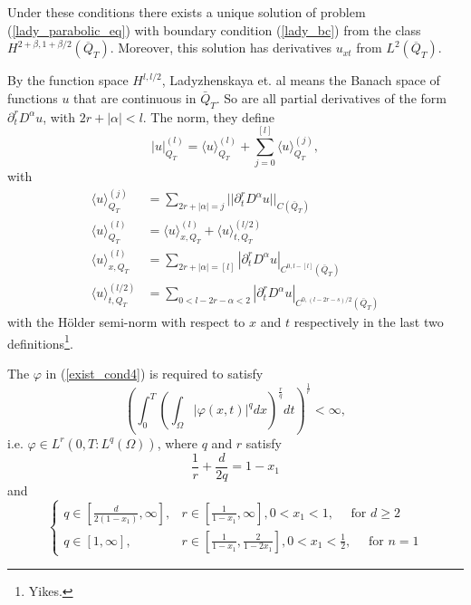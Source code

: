 \documentclass[11pt, a4paper]{article}
\begin{document}
\begin{appendices}
\begin{theorem}
Under these conditions there exists a unique solution of problem (\ref{lady_parabolic_eq}) with boundary condition (\ref{lady_bc}) from the class $H^{2+\beta, 1+\beta/2}(\overline{Q}_T)$. Moreover, this solution has derivatives $u_{xt}$ from $L^2(\overline{Q}_T)$.
\end{theorem}

\setcounter{rem}{0}
\begin{rem}
\label{rem:lady_notation}
By the function space $H^{l, l/2}$, Ladyzhenskaya et. al means the Banach space of functions $u$ that are continuous in $\bar{Q}_T$. So are all partial derivatives of the form $\partial_t^r D^\alpha u$, with $2r+|\alpha| <l$. The norm, they define
\begin{equation*}
	|u|_{Q_T}^{(l)} = \langle u \rangle^{(l)}_{Q_T} + \sum_{j=0}^{[l]}\langle u \rangle^{(j)}_{Q_T},
\end{equation*}
with
\begin{align*}
\langle u \rangle^{(j)}_{Q_T} &= \sum_{2r+|\alpha|=j} ||\partial_t^r D^\alpha u||_{C(\bar{Q}_T)} \\
\langle u \rangle^{(l)}_{Q_T} &= \langle u \rangle^{(l)}_{x,Q_T} + \langle u \rangle^{(l/2)}_{t,Q_T} \\
\langle u \rangle^{(l)}_{x,Q_T} &= \sum_{2r+|\alpha|=[l]} |\partial_t^r D^{\alpha}u|_{C^{0,l-[l]}(\bar{Q}_T)} \\
 \langle u \rangle^{(l/2)}_{t,Q_T} &= \sum_{0 < l - 2r -\alpha < 2} |\partial_t^r D^\alpha u|_{C^{0,(l-2r-s)/2}(\bar{Q}_T)}
\end{align*}
with the Hölder semi-norm with respect to $x$ and $t$ respectively in the last two definitions\footnote{Yikes.}.
\end{rem}

\begin{rem}
The  $\varphi$ in (\ref{exist_cond4}) is required to satisfy
\begin{equation*}
\left( \int_0^T \left(\int_\Omega |\varphi(x,t)|^q dx\right)^\frac{r}{q} dt \right)^\frac{1}{r} < \infty,
\end{equation*}
i.e. $\varphi \in L^r(0,T: L^q(\Omega))$, where $q$ and $r$ satisfy
\begin{equation*}
\frac{1}{r} + \frac{d}{2q} = 1 - x_1
\end{equation*}
and
\begin{equation*}
	\begin{cases}
		q\in \left[\frac{d}{2(1-x_1)},\infty\right], &r\in \left[\frac{1}{1-x_1},\infty \right], 0<x_1<1, \quad \text{ for } d \geq 2 \\
		q \in [1, \infty], &r \in \left[\frac{1}{1-x_1},\frac{2}{1-2x_1}\right], 0<x_1<\frac{1}{2}, \quad \text{ for } n=1
	\end{cases}
\end{equation*}
\end{rem}
 

\end{appendices}
\end{document}
